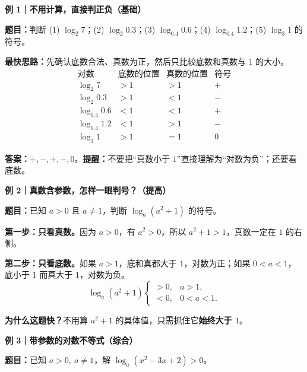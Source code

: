 \begin{examplebox}
  \textbf{\textcolor{CExample}{例 1｜不用计算，直接判正负（基础）}}

  \textbf{题目：}判断 (1) $\log_2 7$；(2) $\log_2 0.3$；(3) $\log_{0.4}0.6$；(4) $\log_{0.4}1.2$；(5) $\log_3 1$ 的符号。

  \textbf{最快思路：}先确认底数合法、真数为正，然后只比较底数和真数与 $1$ 的大小。
  \[
    \begin{array}{c|c|c|c}
      \text{对数}&\text{底数的位置}&\text{真数的位置}&\text{符号}\\ \hline
      \log_2 7 &>1&>1&+\\
      \log_2 0.3 &>1&<1&-\\
      \log_{0.4}0.6 &<1&<1&+\\
      \log_{0.4}1.2 &<1&>1&-\\
      \log_3 1 &>1&=1&0
    \end{array}
  \]
  \begin{center}
  
  \end{center}
  \textbf{答案：}$+,-,+,-,0$。\textbf{提醒：}不要把“真数小于 $1$”直接理解为“对数为负”；还要看底数。

  \medskip
  \textbf{\textcolor{CExample}{例 2｜真数含参数，怎样一眼判号？（提高）}}

  \textbf{题目：}已知 $a>0$ 且 $a\neq1$，判断 $\log_a(a^2+1)$ 的符号。

  \textbf{第一步：只看真数。}因为 $a>0$，有 $a^2>0$，所以 $a^2+1>1$，真数一定在 $1$ 的右侧。

  \textbf{第二步：只看底数。}如果 $a>1$，底和真都大于 $1$，对数为正；如果 $0<a<1$，底小于 $1$ 而真大于 $1$，对数为负。
  \[
    \boxed{\log_a(a^2+1)\begin{cases}>0,&a>1,\\<0,&0<a<1.\end{cases}}
  \]
  \begin{center}
  
  \end{center}
  \textbf{为什么这题快？}不用算 $a^2+1$ 的具体值，只需抓住它\textbf{始终大于 $1$}。

  \medskip
  \textbf{\textcolor{CExample}{例 3｜带参数的对数不等式（综合）}}

  \textbf{题目：}已知 $a>0,\ a\neq1$，解 $\log_a(x^2-3x+2)>0$。


\end{examplebox}
